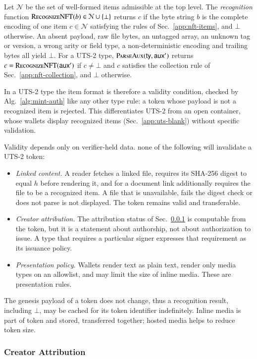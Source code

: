 Let $\mathcal{N}$ be the set of well-formed items admissible at the top level. The \emph{recognition} function $\Call{RecognizeNFT}{b} \in \mathcal{N} \opt$ returns $c$ if the byte string $b$ is the complete encoding of one item $c \in \mathcal{N}$ satisfying the rules of Sec.~\ref{app:nft-items}, and $\bot$ otherwise. An absent payload, raw file bytes, an untagged array, an unknown tag or version, a wrong arity or field type, a non-deterministic encoding and trailing bytes all yield $\bot$. For a UTS-2 type, $\Call{ParseAux}{\mathsf{ty}, \auxd'}$ returns $c = \Call{RecognizeNFT}{\auxd'}$ if $c \ne \bot$ and $c$ satisfies the collection rule of Sec.~\ref{app:nft-collection}, and $\bot$ otherwise.

In a UTS-2 type the item format is therefore a validity condition, checked by Alg.~\ref{alg:mint-auth} like any other type rule: a token whose payload is not a recognized item is rejected. This differentiates UTS-2 from an open container, whose wallets display recognized items (Sec.~\ref{app:uts-blank}) without specific validation.

Validity depends only on verifier-held data. none of the following will invalidate a UTS-2 token:
\begin{itemize}
	\item \emph{Linked content.} A reader fetches a linked file, requires its SHA-256 digest to equal $h$ before rendering it, and for a document link additionally requires the file to be a recognized item. A file that is unavailable, fails the digest check or does not parse is not displayed. The token remains valid and transferable.
	\item \emph{Creator attribution.} The attribution status of Sec.~\ref{app:nft-attribution} is computable from the token, but it is a statement about authorship, not about authorization to issue. A type that requires a particular signer expresses that requirement as its issuance policy.
	\item \emph{Presentation policy.} Wallets render text as plain text, render only media types on an allowlist, and may limit the size of inline media. These are presentation rules.
\end{itemize}

The genesis payload of a token does not change, thus a recognition result, including $\bot$, may be cached for its token identifier indefinitely. Inline media is part of token and stored, transferred together; hosted media helps to reduce token size.

\subsubsection{Creator Attribution}\label{app:nft-attribution}

